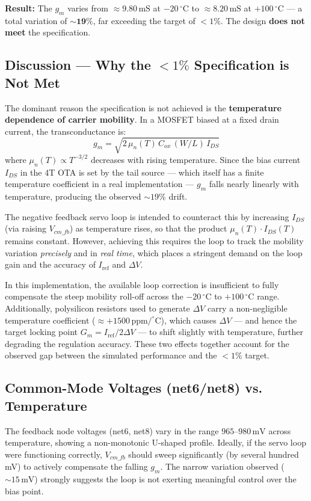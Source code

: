 \documentclass[12pt,a4paper]{article}
\begin{document}
\textbf{Result:} The $g_m$ varies from $\approx 9.80\,\text{mS}$ at $-20\,^\circ$C to
$\approx 8.20\,\text{mS}$ at $+100\,^\circ$C — a total variation of $\mathbf{\sim 19\%}$,
far exceeding the target of $< 1\%$. The design \textbf{does not meet} the specification.

\subsection{Discussion — Why the $< 1\%$ Specification is Not Met}

The dominant reason the specification is not achieved is the \textbf{temperature dependence
of carrier mobility}. In a MOSFET biased at a fixed drain current, the transconductance is:
\[
  g_m = \sqrt{2\,\mu_n(T)\,C_{ox}\,(W/L)\,I_{DS}}
\]
where $\mu_n(T) \propto T^{-3/2}$ decreases with rising temperature. Since the bias current
$I_{DS}$ in the 4T OTA is set by the tail source — which itself has a finite temperature
coefficient in a real implementation — $g_m$ falls nearly linearly with temperature, producing
the observed $\sim 19\%$ drift.

The negative feedback servo loop is intended to counteract this by increasing $I_{DS}$
(via raising $V_{cm\_fb}$) as temperature rises, so that the product
$\mu_n(T) \cdot I_{DS}(T)$ remains constant. However, achieving this requires the loop to
track the mobility variation \emph{precisely} and in \emph{real time}, which places a
stringent demand on the loop gain and the accuracy of $I_{\text{ref}}$ and $\Delta V$.

In this implementation, the available loop correction is insufficient to fully compensate
the steep mobility roll-off across the $-20\,^\circ$C to $+100\,^\circ$C range. Additionally,
polysilicon resistors used to generate $\Delta V$ carry a non-negligible temperature
coefficient ($\approx +1500\,\text{ppm/}^\circ$C), which causes $\Delta V$ — and hence
the target locking point $G_m = I_{\text{ref}}/2\Delta V$ — to shift slightly with
temperature, further degrading the regulation accuracy. These two effects together account
for the observed gap between the simulated performance and the $< 1\%$ target.

\subsection{Common-Mode Voltages (net6/net8) vs. Temperature}

The feedback node voltages (net6, net8) vary in the range $965$--$980\,\text{mV}$ across
temperature, showing a non-monotonic U-shaped profile. Ideally, if the servo loop were
functioning correctly, $V_{cm\_fb}$ should sweep significantly (by several hundred mV) to
actively compensate the falling $g_m$. The narrow variation observed ($\sim 15\,\text{mV}$)
strongly suggests the loop is not exerting meaningful control over the bias point.
\end{document}
